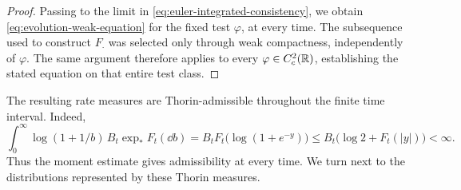 \begin{proof}
Passing to the limit in \eqref{eq:euler-integrated-consistency}, we obtain \eqref{eq:evolution-weak-equation} for the fixed test \(\varphi\), at every time.
The subsequence used to construct \(F_\cdot\) was selected only through weak compactness, independently of \(\varphi\).
The same argument therefore applies to every \(\varphi\in C_c^2(\mathbb R)\), establishing the stated equation on that entire test class.
\end{proof}

\begin{remark}
The resulting rate measures are Thorin-admissible throughout the finite time interval.
Indeed,
\[
 \int_0^\infty\log(1+1/b)\,
                B_t\exp_*F_t(\dd b)
 =B_tF_t\bigl(\log(1+e^{-y})\bigr)
 \le B_t\bigl(\log2+F_t(|y|)\bigr)<\infty.
 \]
Thus the moment estimate gives admissibility at every time.
We turn next to the distributions represented by these Thorin measures.
\end{remark}
